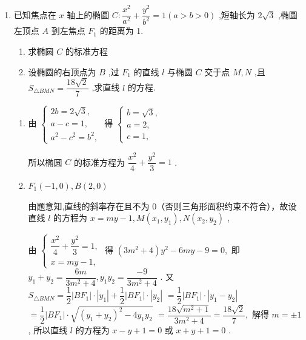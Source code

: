 \begin{enumerate}
\begin{enumerate}
        \item 已知焦点在 $x$ 轴上的椭圆 $C : \dfrac{{x}^{2}}{{a}^{2}} + \dfrac{{y}^{2}}{{b}^{2}} = 1\left( {a > b > 0}\right)$ ,短轴长为 $2\sqrt{3}$ ,椭圆左顶点 $A$ 到左焦点 ${F}_{1}$ 的距离为 1.
        \begin{enumerate}
            \item 求椭圆 $C$ 的标准方程
            \item 设椭圆的右顶点为 $B$ ,过 ${F}_{1}$ 的直线 $l$ 与椭圆 $C$ 交于点 $M,N$ ,且 ${S}_{\bigtriangleup {BMN}} = \dfrac{{18}\sqrt{2}}{7}$ ,求直线 $l$ 的方程.
        \end{enumerate}
        \begin{jieda}
            \begin{enumerate}
                \item 由 $\left\{  \begin{array}{l} {2b} = 2\sqrt{3}, \\  a - c = 1, \\  {a}^{2} - {c}^{2} = {b}^{2}, \end{array}\right.$ 得 $\left\{  \begin{array}{l} b = \sqrt{3}, \\  a = 2, \\  c = 1, \end{array}\right.$
                
                所以椭圆 $C$ 的标准方程为 $\dfrac{{x}^{2}}{4} + \dfrac{{y}^{2}}{3} = 1$ .
                \item             ${F}_{1}\left( {-1,0}\right) ,B\left( {2,0}\right)$
                
                由题意知,直线的斜率存在且不为 $0$（否则三角形面积约束不符合），故设直线 $l$ 的方程为 $x = {my} - 1,M\left( {{x}_{1},{y}_{1}}\right) ,N\left( {{x}_{2},{y}_{2}}\right)$ ,
                
                由 $\left\{  {\begin{array}{l} \dfrac{{x}^{2}}{4} + \dfrac{{y}^{2}}{3} = 1, \\  x = {my} - 1, \end{array}\text{ 得 }\left( {3{m}^{2} + 4}\right) {y}^{2} - {6my} - 9 = 0,}\right.$ 即 ${y}_{1} + {y}_{2} = \dfrac{6m}{3{m}^{2} + 4},{y}_{1}{y}_{2} = \dfrac{-9}{3{m}^{2} + 4}$ . 又 ${S}_{\bigtriangleup {BMN}} = \dfrac{1}{2}\left| {B{F}_{1}}\right|  \cdot  \left| {y}_{1}\right|  + \dfrac{1}{2}\left| {B{F}_{1}}\right|  \cdot  \left| {y}_{2}\right|$  $= \dfrac{1}{2}\left| {B{F}_{1}}\right|  \cdot  \left| {{y}_{1} - {y}_{2}}\right|$  $= \dfrac{1}{2}\left| {B{F}_{1}}\right|  \cdot  \sqrt{{\left( {y}_{1} + {y}_{2}\right) }^{2} - 4{y}_{1}{y}_{2}}$  $= \dfrac{{18}\sqrt{{m}^{2} + 1}}{3{m}^{2} + 4} = \dfrac{{18}\sqrt{2}}{7},$ 解得 $m =  \pm  1$ , 所以直线 $l$ 的方程为 $x - y + 1 = 0$ 或 $x + y + 1 = 0$ .
            \end{enumerate}
        \end{jieda}
        

\end{enumerate}
\end{enumerate}
